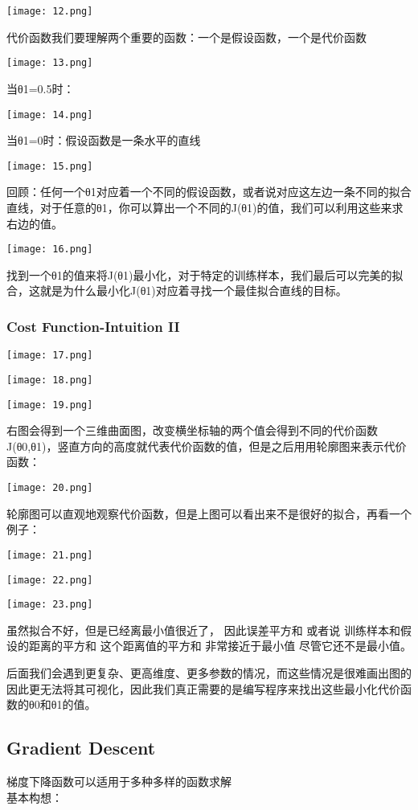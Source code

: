 \documentclass{article}
\begin{document}
\begin{CJK}{UTF8}{gbsn}
\texttt{[image: 12.png]}

代价函数我们要理解两个重要的函数：一个是假设函数，一个是代价函数

\texttt{[image: 13.png]}

当θ1=0.5时：

\texttt{[image: 14.png]}

当θ1=0时：假设函数是一条水平的直线

\texttt{[image: 15.png]}

回顾：任何一个θ1对应着一个不同的假设函数，或者说对应这左边一条不同的拟合直线，对于任意的θ1，你可以算出一个不同的J(θ1)的值，我们可以利用这些来求右边的值。

\texttt{[image: 16.png]}

找到一个θ1的值来将J(θ1)最小化，对于特定的训练样本，我们最后可以完美的拟合，这就是为什么最小化J(θ1)对应着寻找一个最佳拟合直线的目标。
\subsubsection{Cost Function-Intuition II}

\texttt{[image: 17.png]}

\texttt{[image: 18.png]}

\texttt{[image: 19.png]}

右图会得到一个三维曲面图，改变横坐标轴的两个值会得到不同的代价函数J(θ0,θ1)，竖直方向的高度就代表代价函数的值，但是之后用用轮廓图来表示代价函数：

\texttt{[image: 20.png]}

轮廓图可以直观地观察代价函数，但是上图可以看出来不是很好的拟合，再看一个例子：

\texttt{[image: 21.png]}

\texttt{[image: 22.png]}

\texttt{[image: 23.png]}

虽然拟合不好，但是已经离最小值很近了， 因此误差平方和 或者说 训练样本和假设的距离的平方和 这个距离值的平方和 非常接近于最小值 尽管它还不是最小值。

后面我们会遇到更复杂、更高维度、更多参数的情况，而这些情况是很难画出图的 因此更无法将其可视化，因此我们真正需要的是编写程序来找出这些最小化代价函数的θ0和θ1的值。

\subsection{Gradient Descent}
梯度下降函数可以适用于多种多样的函数求解\\
基本构想：


\end{CJK}
\end{document}
